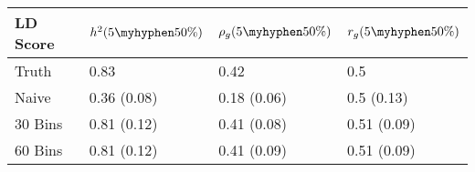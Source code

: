 \begin{table}[ht]
\centering
\begin{tabular}{llll}
  \hline
LD Score & $h^2(5\myhyphen50\%)$ & $\rho_g(5\myhyphen50\%)$ & $r_g(5\myhyphen50\%)$ \\ 
  \hline
Truth & 0.83 & 0.42 & 0.5 \\ 
  Naive & 0.36 (0.08) & 0.18 (0.06) & 0.5 (0.13) \\ 
  30 Bins & 0.81 (0.12) & 0.41 (0.08) & 0.51 (0.09) \\ 
  60 Bins & 0.81 (0.12) & 0.41 (0.09) & 0.51 (0.09) \\ 
   \hline
\end{tabular}
\end{table}
